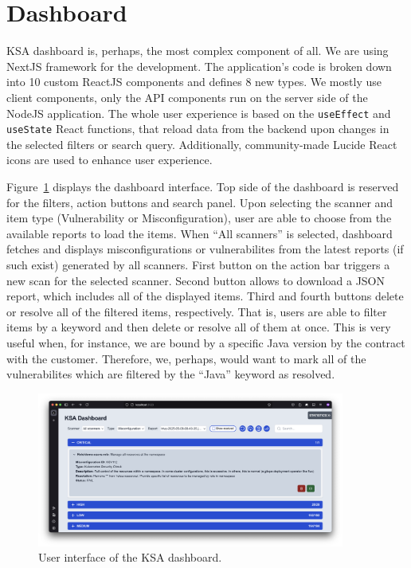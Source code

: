 \section{Dashboard}
\label{sec:dashboard}

KSA dashboard is, perhaps, the most complex component of all. We are using NextJS framework for the development. The application's code is broken down into 10 custom ReactJS components and defines 8 new types. We mostly use client components, only the API components run on the server side of the NodeJS application. The whole user experience is based on the \lstinline{useEffect} and \lstinline{useState} React functions, that reload data from the backend upon changes in the selected filters or search query. Additionally, community-made Lucide React icons are used to enhance user experience.

Figure~\ref{img:ksa-dashboard-ui} displays the dashboard interface. Top side of the dashboard is reserved for the filters, action buttons and search panel. Upon selecting the scanner and item type (Vulnerability or Misconfiguration), user are able to choose from the available reports to load the items. When ``All scanners'' is selected, dashboard fetches and displays misconfigurations or vulnerabilites from the latest reports (if such exist) generated by all scanners. First button on the action bar triggers a new scan for the selected scanner. Second button allows to download a JSON report, which includes all of the displayed items. Third and fourth buttons delete or resolve all of the filtered items, respectively. That is, users are able to filter items by a keyword and then delete or resolve all of them at once. This is very useful when, for instance, we are bound by a specific Java version by the contract with the customer. Therefore, we, perhaps, would want to mark all of the vulnerabilites which are filtered by the ``Java'' keyword as resolved.

\begin{figure}[!hbt]
	\begin{center}
		\includegraphics[width=0.9\textwidth]{images/ksa-dashboard-ui.png}
        \caption{User interface of the KSA dashboard.}
		\label{img:ksa-dashboard-ui}
	\end{center}
\end{figure}


